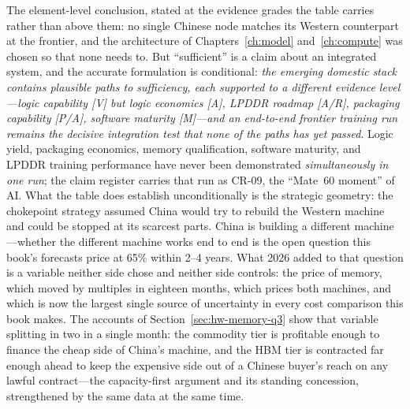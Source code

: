The element-level conclusion, stated at the evidence grades the table carries rather than above them: no single Chinese node matches its Western counterpart at the frontier, and the architecture of Chapters~\ref{ch:model} and~\ref{ch:compute} was chosen so that none needs to. But ``sufficient'' is a claim about an integrated system, and the accurate formulation is conditional: \emph{the emerging domestic stack contains plausible paths to sufficiency, each supported to a different evidence level---logic capability [V] but logic economics [A], LPDDR roadmap [A/R], packaging capability [P/A], software maturity [M]---and an end-to-end frontier training run remains the decisive integration test that none of the paths has yet passed}. Logic yield, packaging economics, memory qualification, software maturity, and LPDDR training performance have never been demonstrated \emph{simultaneously in one run}; the claim register carries that run as CR-09, the ``Mate~60 moment'' of AI. What the table does establish unconditionally is the strategic geometry: the chokepoint strategy assumed China would try to rebuild the Western machine and could be stopped at its scarcest parts. China is building a different machine---whether the different machine works end to end is the open question this book's forecasts price at 65\% within 2--4 years. What 2026 added to that question is a variable neither side chose and neither side controls: the price of memory, which moved by multiples in eighteen months, which prices both machines, and which is now the largest single source of uncertainty in every cost comparison this book makes. The accounts of Section~\ref{sec:hw-memory-q3} show that variable splitting in two in a single month: the commodity tier is profitable enough to finance the cheap side of China's machine, and the HBM tier is contracted far enough ahead to keep the expensive side out of a Chinese buyer's reach on any lawful contract---the capacity-first argument and its standing concession, strengthened by the same data at the same time.
